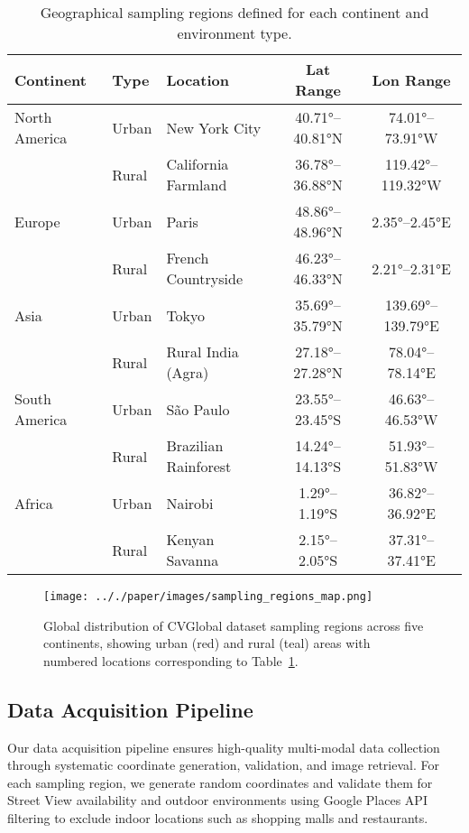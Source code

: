 \begin{table}[t]
\centering
\caption{Geographical sampling regions defined for each continent and environment type.}
\label{tab:sampling_regions}
\begin{tabular}{lllcc}
\toprule
\textbf{Continent} & \textbf{Type} & \textbf{Location} & \textbf{Lat Range} & \textbf{Lon Range} \\
\midrule
North America & Urban & New York City & 40.71°--40.81°N & 74.01°--73.91°W \\
              & Rural & California Farmland & 36.78°--36.88°N & 119.42°--119.32°W \\
\midrule
Europe & Urban & Paris & 48.86°--48.96°N & 2.35°--2.45°E \\
       & Rural & French Countryside & 46.23°--46.33°N & 2.21°--2.31°E \\
\midrule
Asia & Urban & Tokyo & 35.69°--35.79°N & 139.69°--139.79°E \\
     & Rural & Rural India (Agra) & 27.18°--27.28°N & 78.04°--78.14°E \\
\midrule
South America & Urban & São Paulo & 23.55°--23.45°S & 46.63°--46.53°W \\
              & Rural & Brazilian Rainforest & 14.24°--14.13°S & 51.93°--51.83°W \\
\midrule
Africa & Urban & Nairobi & 1.29°--1.19°S & 36.82°--36.92°E \\
       & Rural & Kenyan Savanna & 2.15°--2.05°S & 37.31°--37.41°E \\
\bottomrule
\end{tabular}
\end{table}

\begin{figure}[t]
    \centering
    \texttt{[image: .././paper/images/sampling\_regions\_map.png]}
    \caption{Global distribution of CVGlobal dataset sampling regions across five continents, showing urban (red) and rural (teal) areas with numbered locations corresponding to Table~\ref{tab:sampling_regions}.}
    \label{fig:sampling_regions}
\end{figure}

\subsection{Data Acquisition Pipeline}

Our data acquisition pipeline ensures high-quality multi-modal data collection through systematic coordinate generation, validation, and image retrieval. For each sampling region, we generate random coordinates and validate them for Street View availability and outdoor environments using Google Places API filtering to exclude indoor locations such as shopping malls and restaurants.

